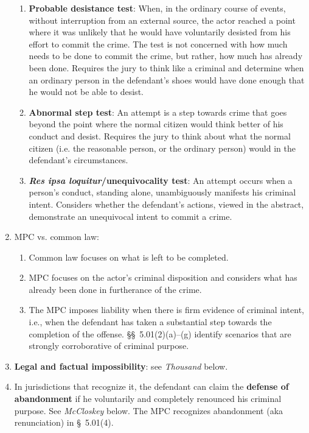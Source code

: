 \begin{enumerate}
\begin{enumerate}
        \item \textbf{Probable desistance test}: When, in the ordinary course 
        of events, without interruption from an external source, the actor 
        reached a point where it was unlikely that he would have voluntarily 
        desisted from his effort to commit the crime. The test is not 
        concerned with how much needs to be done to commit the crime, but 
        rather, how much has already been done. Requires the jury to think 
        like a criminal and determine when an ordinary person in the 
        defendant's shoes would have done enough that he would not be able to 
        desist.
        \item \textbf{Abnormal step test}: An attempt is a step towards crime 
        that goes beyond the point where the normal citizen would think better 
        of his conduct and desist.  Requires the jury to think about what the 
        normal citizen (i.e. the reasonable person, or the ordinary person) 
        would in the defendant's circumstances.
        \item \textbf{\emph{Res ipsa loquitur}/unequivocality test}:  An 
        attempt occurs when a person's conduct, standing alone, unambiguously 
        manifests his criminal intent.  Considers whether the defendant's 
        actions, viewed in the abstract, demonstrate an unequivocal intent to 
        commit a crime.
    \end{enumerate}
    \item MPC vs. common law:
    \begin{enumerate}
        \item Common law focuses on what is left to be completed.
        \item MPC focuses on the actor's criminal disposition and considers 
        what has already been done in furtherance of the crime.
        \item The MPC imposes liability when there is firm evidence of 
        criminal intent, i.e., when the defendant has taken a substantial step 
        towards the completion of the offense. \S\S\ 5.01(2)(a)--(g) identify 
        scenarios that are strongly corroborative of criminal purpose.
    \end{enumerate}
    \item \textbf{Legal and factual impossibility}: see \emph{Thousand} below.
    \item In jurisdictions that recognize it, the defendant can claim the 
    \textbf{defense of abandonment} if he voluntarily and completely renounced 
    his criminal purpose. See \emph{McCloskey} below. The MPC recognizes 
    abandonment (aka renunciation) in \S\ 5.01(4).
\end{enumerate}

